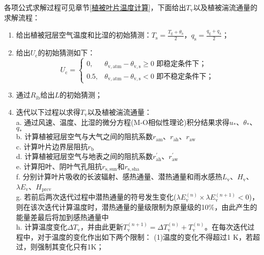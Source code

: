 各项公式求解过程可见章节\ref{植被叶片温度计算}，下面给出$T_{\mathrm {v}} $以及植被湍流通量的求解流程：
\begin{enumerate}
  \item 给出植被冠层空气温度和比湿的初始猜测：$T_{\mathrm {s}} =\frac{T_{\mathrm {g}} +\theta_{\mathrm{a}}}{2}$，$q_{\mathrm {s}} =\frac{q_{\mathrm {g}} +q_{\mathrm{a}}}{2}$；
  \item 给出$U_{\mathrm {c}} $的初始猜测如下：\\
    \begin{equation*}
      U_{\mathrm {c}} = \begin{cases}
        0,  & \theta_{\mathrm{v,atm}}-\theta_{\mathrm{v,s}}\geqslant0 \text{ 即稳定条件下；} \\
        0.5, & \theta_{\mathrm{v,atm}}-\theta_{\mathrm{v,s}}<0 \text{ 即不稳定条件下；}
      \end{cases}
    \end{equation*}
  \item 通过$R_{\mathrm{ib}}$给出$L$的初始猜测；
  \item 迭代以下过程以求得$T_{\mathrm {v}} $以及植被湍流通量：\\
    a. 通过风速、温度、比湿的微分方程(M-O相似性理论)积分结果求得$u_\ast$、$\theta_\ast$、$q_\ast$ \\
    b. 计算植被冠层空气与大气之间的阻抗系数$r_{\mathrm{am}}$、$r_{\mathrm{ah}}$、$r_{\mathrm{aw}}$ \\
    c. 计算叶片边界层阻抗$r_{\mathrm {b}} $ \\
    d. 计算植被冠层空气与地表之间的阻抗系数$r_{\mathrm{ah}}^\prime$、$r_{\mathrm{aw}}^\prime$ \\
    e. 计算阳叶、阴叶气孔阻抗$r_{\mathrm{s,sun}}$和$r_{\mathrm{s,sha}}$ \\
    f. 分别计算叶片吸收的长波辐射、感热通量、潜热通量和雨水感热$L_{\mathrm {v}} $、$H_{\mathrm{v}}$、$\lambda E_{\mathrm{v}}$、$H_{\mathrm{prcv}}$ \\
    g. 若前后两次迭代过程中潜热通量的符号发生变化($\lambda E_{\mathrm{v}}^{\left(n\right)}\times\lambda E_{\mathrm{v}}^{\left(n+1\right)}<0$)，
    则在该次迭代计算温度时，潜热通量的量级限制为原量级的10\%，由此产生的能量差最后将加到感热通量中 \\
    h. 计算温度变化$\Delta T_{\mathrm {v}} $，并由此更新$T_{\mathrm {v}} ^{\left(n+1\right)}=\Delta T_{\mathrm {v}} ^{\left(n\right)}+T_{\mathrm {v}} ^{\left(n\right)}$。在每次迭代过程中，对于温度的变化作出如下两个限制：
    (1)温度的变化不得超过1 K，若超过，则强制其变化只有1K；

\end{enumerate}
